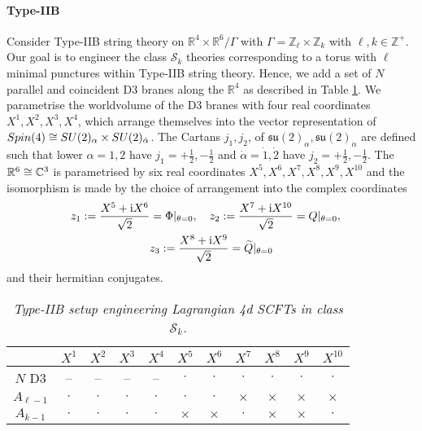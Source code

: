 \documentclass[main.tex]{subfiles}
\begin{document}
\paragraph{Type-IIB}
Consider Type-IIB string theory on $\mathbb{R}^4\times\mathbb{R}^6/\Gamma$ with $\Gamma=\mathbb{Z}_{\ell}\times\mathbb{Z}_k$ with $\ell,k\in\mathbb{Z}^+$.  Our goal is to engineer the class $\mathcal{S}_k$ theories corresponding to a torus with $\ell$ minimal punctures within Type-IIB string theory.  Hence, we add a set of $N$ parallel and coincident D$3$ branes along the $\mathbb{R}^4$ as described in Table \ref{table:D3D-1}.  We parametrise the worldvolume of the D$3$ branes with four real coordinates $X^1,X^2,X^3,X^4$, which arrange themselves into the vector representation of $Spin(4)\cong SU(2)_{\alpha}\times SU(2)_{\dot\alpha}$.  The Cartans $j_1,j_2$, of $\mathfrak{su}(2)_{\alpha},\mathfrak{su}(2)_{\dot\alpha}$ are defined such that lower $\alpha=1,2$ have $j_1=+\frac{1}{2},-\frac{1}{2}$ and $\dot{\alpha}=\dot1,\dot2$ have $j_2=+\frac{1}{2},-\frac{1}{2}$.  The $\mathbb{R}^6\cong\mathbb{C}^3$ is parametrised by six real coordinates $X^5,X^6,X^7,X^8,X^9,X^{10}$ and the isomorphism is made by the choice of arrangement into the complex coordinates
\begin{gather}
\label{eqn:coordinates}
z_1
:=\frac{X^5+\mathrm{i} X^6}{\sqrt{2}}=\Phi|_{\theta=0},\quad 
z_{2}
:=\frac{X^7+\mathrm{i} X^{10}}{\sqrt{2}}=Q|_{\theta=0},\quad 
\\
z_3
:=\frac{X^8+\mathrm{i} X^9}{\sqrt{2}}=\widetilde{Q}|_{\theta=0}
\end{gather} 
and their hermitian conjugates.
\begin{table}
\centering
\begin{tabular}{ |c |c| c| c| c| c| c| c| c| c| c| }
\hline
   & $X^1$ & $X^2$ & $X^3$ & $X^4$ & $X^5$ & $X^6$ & $X^7$ & $X^8$ & $X^9$& $X^{10}$\\\hline 
 $N$ D$3$ & -- & -- & -- & -- & $\cdot$ & $\cdot$ & $\cdot$ & $\cdot$ & $\cdot$ & $\cdot$\\ \hline
 $A_{\ell-1}$ & $\cdot$ & $\cdot$ & $\cdot$ & $\cdot$ & $\cdot$ & $\cdot$ & $\times$ & $\times$ & $\times$ & $\times$\\ \hline
 $A_{k-1}$ & $\cdot$ & $\cdot$ & $\cdot$ & $\cdot$ & $\times$ & $\times$ & $\cdot$ & $\times$ & $\times$ & $\cdot$\\ \hline
\end{tabular}
\caption{\it Type-IIB setup engineering Lagrangian 4d SCFTs in class $\mathcal{S}_k$.}
\label{table:D3D-1}
\end{table}
\end{document}
